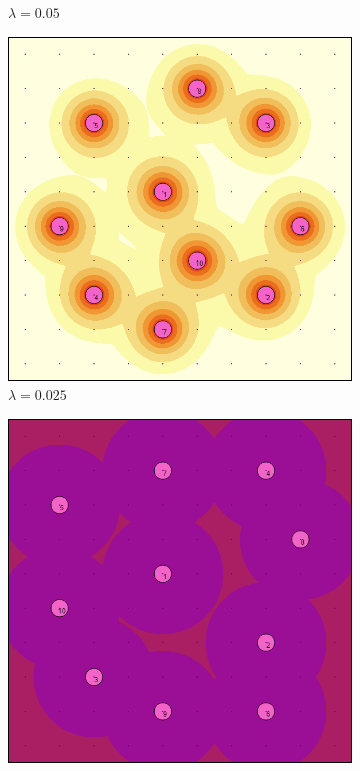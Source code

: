 \documentclass[letterpaper, 10 pt, conference]{ieeeconf}
\begin{document}
\begin{figure}[!t]
\begin{subfigure}[t]{0.30\columnwidth}
    \caption{$\lambda = 0.05$}
\end{subfigure}%
\hfill
\begin{subfigure}[t]{0.30\columnwidth}
    \centering
    \includegraphics[width=\columnwidth]{Figures/BlankDecay025.png}
    \caption{$\lambda = 0.025$}
\end{subfigure}%
\hfill
\begin{subfigure}[t]{0.30\columnwidth}
    \centering
    \includegraphics[width=\columnwidth]{Figures/BlankDecay001.png}

\end{subfigure}
\end{figure}
\end{document}
